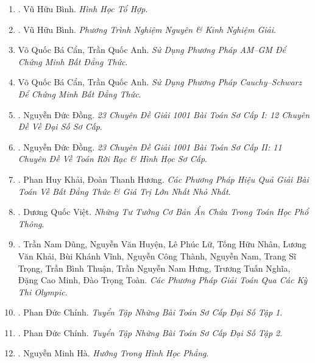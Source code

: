 \documentclass{article}
\begin{document}
\begin{enumerate}
	\item \cite{Binh_HHTH}. Vũ Hữu Bình. {\it Hình Học Tổ Hợp}.\hfill{\sf[reading]}
	
	\item \cite{Binh_PTNN}. Vũ Hữu Bình. {\it Phương Trình Nghiệm Nguyên \& Kinh Nghiệm Giải}.\hfill{\sf[reading]}
	
	\item Võ Quốc Bá Cẩn, Trần Quốc Anh. {\it Sử Dụng Phương Pháp AM--GM Để Chứng Minh Bất Đẳng Thức}.
	
	\item Võ Quốc Bá Cẩn, Trần Quốc Anh. {\it Sử Dụng Phương Pháp Cauchy--Schwarz Để Chứng Minh Bất Đẳng Thức}.
	
	\item \cite{Dong_23_1001_toan_I}. Nguyễn Đức Đồng. {\it 23 Chuyên Đề Giải 1001 Bài Toán Sơ Cấp I: 12 Chuyên Đề Về Đại Số Sơ Cấp}.\hfill{\sf[reading]}
	
	\item \cite{Dong_23_1001_toan_II}. Nguyễn Đức Đồng. {\it 23 Chuyên Đề Giải 1001 Bài Toán Sơ Cấp II: 11 Chuyên Đề Về Toán Rời Rạc \& Hình Học Sơ Cấp}.\hfill{\sf[reading]}
	
	\item \cite{Khai_Huong_bdt}. Phan Huy Khải, Đoàn Thanh Hương. {\it Các Phương Pháp Hiệu Quả Giải Bài Toán Về Bất Đẳng Thức \& Giá Trị Lớn Nhất Nhỏ Nhất}.\hfill{\sf[reading]}
	
	\item \cite{Viet2014}. Dương Quốc Việt. {\it Những Tư Tưởng Cơ Bản Ẩn Chứa Trong Toán Học Phổ Thông}.\hfill{\sf[done]}
	
	\item \cite{Dung_cac_phuong_phap_giai_toan_qua_cac_ky_thi_olympic_2022}. Trần Nam Dũng, Nguyễn Văn Huyện, Lê Phúc Lữ, Tống Hữu Nhân, Lương Văn Khải, Bùi Khánh Vĩnh, Nguyễn Công Thành, Nguyễn Nam, Trang Sĩ Trọng, Trần Bình Thuận, Trần Nguyễn Nam Hưng, Trương Tuấn Nghĩa, Đặng Cao Minh, Đào Trọng Toàn. {\it Các Phương Pháp Giải Toán Qua Các Kỳ Thi Olympic}.\hfill{\sf[reading]}
	
	\item \cite{Chinh2021_tap_1}. Phan Đức Chính. {\it Tuyển Tập Những Bài Toán Sơ Cấp Đại Số Tập 1}.\hfill{\sf[reading]}
	
	\item \cite{Chinh2021_tap_2}. Phan Đức Chính. {\it Tuyển Tập Những Bài Toán Sơ Cấp Đại Số Tập 2}.\hfill{\sf[reading]}
	
	\item \cite{Ha_huong}. {\sc Nguyễn Minh Hà}. {\it Hướng Trong Hình Học Phẳng}.\hfill{\sf[done]}
	

\end{enumerate}
\end{document}
